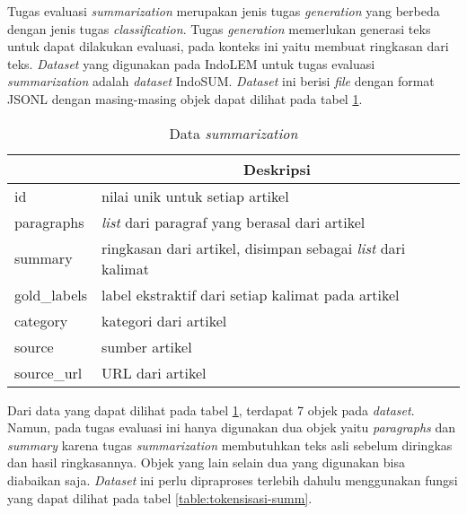 Tugas evaluasi \textit{summarization} merupakan jenis tugas \textit{generation} yang berbeda dengan jenis tugas \textit{classification}. Tugas \textit{generation} memerlukan generasi teks untuk dapat dilakukan evaluasi, pada konteks ini yaitu membuat ringkasan dari teks. \textit{Dataset} yang digunakan pada IndoLEM untuk tugas evaluasi \textit{summarization} adalah \textit{dataset} IndoSUM. \textit{Dataset} ini berisi \textit{file} dengan format JSONL dengan masing-masing objek dapat dilihat pada tabel \ref{table:data-summarization}.

\begin{table}[h]
    \caption{Data \textit{summarization}}
    \label{table:data-summarization}
    \begin{center}
        \begin{tabular}{|l|l|}
            \hline \rowcolor{black!10}
            \multicolumn{1}{|c|}{\textbf{Objek}} & \multicolumn{1}{|c|}{\textbf{Deskripsi}} \\ \hline
            id & nilai unik untuk setiap artikel \\ \hline
            paragraphs & \textit{list} dari paragraf yang berasal dari artikel \\ \hline
            summary & ringkasan dari artikel, disimpan sebagai \textit{list} dari kalimat \\ \hline 
            gold\_labels & label ekstraktif dari setiap kalimat pada artikel \\ \hline
            category & kategori dari artikel \\ \hline
            source & sumber artikel \\ \hline
            source\_url & URL dari artikel \\ \hline
        \end{tabular}
    \end{center}
\end{table}

Dari data yang dapat dilihat pada tabel \ref{table:data-summarization}, terdapat 7 objek  pada \textit{dataset}. Namun, pada tugas evaluasi ini hanya  digunakan dua objek yaitu \textit{paragraphs} dan \textit{summary} karena tugas \textit{summarization} membutuhkan teks asli sebelum diringkas dan hasil ringkasannya. Objek yang lain selain dua yang digunakan bisa diabaikan saja. \textit{Dataset} ini perlu dipraproses terlebih dahulu menggunakan fungsi yang dapat dilihat pada tabel \ref{table:tokensisasi-summ}.

